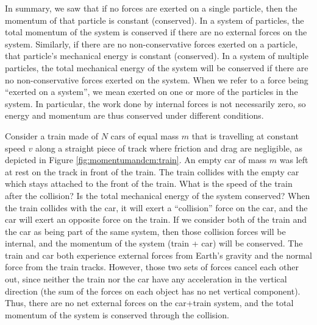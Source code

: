 In summary, we saw that if no forces are exerted on a single particle, then the momentum of that particle is constant (conserved). In a system of particles, the total momentum of the system is conserved if there are no external forces on the system. Similarly, if there are no non-conservative forces exerted on a particle, that particle's mechanical energy is constant (conserved). In a system of multiple particles, the total mechanical energy of the system will be conserved if there are no non-conservative forces exerted on the system. When we refer to a force being ``exerted on a system'', we mean exerted on one or more of the particles in the system. In particular, the work done by internal forces is not necessarily zero, so energy and momentum are thus conserved under different conditions.
\begin{example}{
 Consider a train made of $N$ cars of equal mass $m$ that is travelling at constant speed $v$ along a straight piece of track where friction and drag are negligible, as depicted in Figure \ref{fig:momentumandcm:train}. An empty car of mass $m$ was left at rest on the track in front of the train. The train collides with the empty car which stays attached to the front of the train. What is the speed of the train after the collision? Is the total mechanical energy of the system conserved?}
When the train collides with the car, it will exert a ``collision'' force on the car, and the car will exert an opposite force on the train. If we consider both of the train and the car as being part of the same system, then those collision forces will be internal, and the momentum of the system (train + car) will be conserved. The train and car both experience external forces from Earth's gravity and the normal force from the train tracks. However, those two sets of forces cancel each other out, since neither the train nor the car have any acceleration in the vertical direction (the sum of the forces on each object has no net vertical component). Thus, there are no net external forces on the car+train system, and the total momentum of the system is conserved through the collision.


\end{example}
